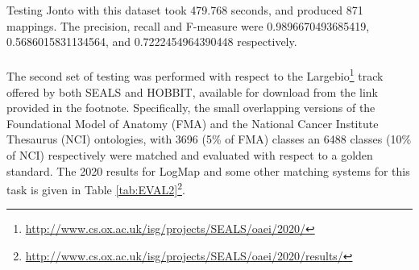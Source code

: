 Testing Jonto with this dataset took 479.768 seconds, and produced 871 mappings. The precision, recall and F-measure were 0.9896670493685419, 0.5686015831134564, and 0.7222454964390448 respectively.
\\\\
The second set of testing was performed with respect to the Largebio\footnote{\url{http://www.cs.ox.ac.uk/isg/projects/SEALS/oaei/2020/}} track offered by both SEALS and HOBBIT, available for download from the link provided in the footnote. Specifically, the small overlapping versions of the Foundational Model of Anatomy (FMA) and the National Cancer Institute Thesaurus (NCI) ontologies, with 3696 (5\% of FMA) classes an 6488 classes (10\% of NCI) respectively were matched and evaluated with respect to a golden standard. The 2020 results for LogMap and some other matching systems for this task is given in Table \ref{tab:EVAL2}\footnote{\url{http://www.cs.ox.ac.uk/isg/projects/SEALS/oaei/2020/results/}}.

